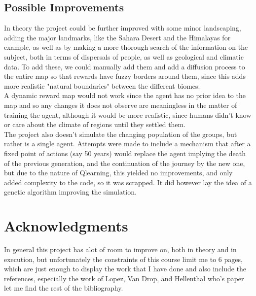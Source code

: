 \documentclass[11pt]{article}
\begin{document}
\begin{multicols}{2}
\subsection{Possible Improvements}
In theory the project could be further improved with some minor landscaping, adding the major landmarks, like the Sahara Desert and the Himalayas for example, as well as by making a more thorough search of the information on the subject, both in terms of dispersals of people, as well as geological and climatic data. To add these, we could manually add them and add a diffusion process to the entire map so that rewards have fuzzy borders around them, since this adds more realistic "natural boundaries" between the different biomes.\\
A dynamic reward map would not work since the agent has no prior idea to the map and so any changes it does not observe are meaningless in the matter of training the agent, although it would be more realistic, since humans didn't know or care about the climate of regions until they settled them.\\
The project also doesn't simulate the changing population of the groups, but rather is a single agent. Attempts were made to include a mechanism that after a fixed point of actions (say 50 years) would replace the agent  implying the death of the previous generation, and the continuation of the journey by the new one, but due to the nature of Qlearning, this yielded no improvements, and only added complexity to the code, so it was scrapped. It did however lay the idea of a genetic algorithm improving the simulation.
\section*{Acknowledgments}
In general this project has alot of room to improve on, both in theory and in execution, but unfortunately the constraints of this course limit me to 6 pages, which are just enough to display the work that I have done and also include the references, especially the work of Lopez, Van Drop, and Hellenthal\cite{EOBO} who's paper let me find the rest of the bibliography.
\newcolumn
\nocite{*}
\printbibliography
\end{multicols}
\end{document}
